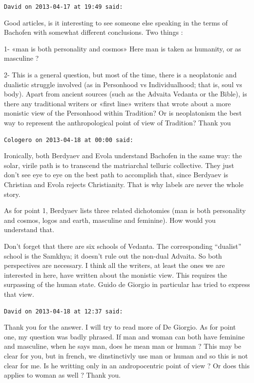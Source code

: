 \begin{footnotesize}
\begin{sffamily}
\texttt{David on 2013-04-17 at 19:49 said:}

Good articles, is it interesting to see someone else speaking in the terms of Bachofen with somewhat different conclusions. Two things :

1- «man is both personality and cosmos» Here man is taken as humanity, or as masculine ?

2- This is a general question, but most of the time, there is a neoplatonic and dualistic struggle involved (as in Personhood vs Individualhood; that is, soul vs body). Apart from ancient sources (such as the Advaita Vedanta or the Bible), is there any traditional writers or «first line» writers that wrote about a more monistic view of the Personhood within Tradition? Or is neoplatonism the best way to represent the anthropological point of view of Tradition? Thank you

\hfill

\texttt{Cologero on 2013-04-18 at 00:00 said:}

Ironically, both Berdyaev and Evola understand Bachofen in the same way: the solar, virile path is to transcend the matriarchal telluric collective. They just don't see eye to eye on the best path to accomplish that, since Berdyaev is Christian and Evola rejects Christianity. That is why labels are never the whole story.

As for point 1, Berdyaev lists three related dichotomies (man is both personality and cosmos, logos and earth, masculine and feminine). How would you understand that.

Don't forget that there are six schools of Vedanta. The corresponding ``dualist'' school is the Samkhya; it doesn't rule out the non-dual Advaita. So both perspectives are necessary. I think all the writers, at least the ones we are interested in here, have written about the monistic view. This requires the surpassing of the human state. Guido de Giorgio in particular has tried to express that view.

\hfill

\texttt{David on 2013-04-18 at 12:37 said:}

Thank you for the answer. I will try to read more of De Giorgio. As for point one, my question was badly phrased. If man and woman can both have feminine and masculine, when he says man, does he mean man or human ? This may be clear for you, but in french, we dinstinctivly use man or human and so this is not clear for me. Is he writting only in an andropocentric point of view ? Or does this applies to woman as well ? Thank you.


\end{sffamily}
\end{footnotesize}
